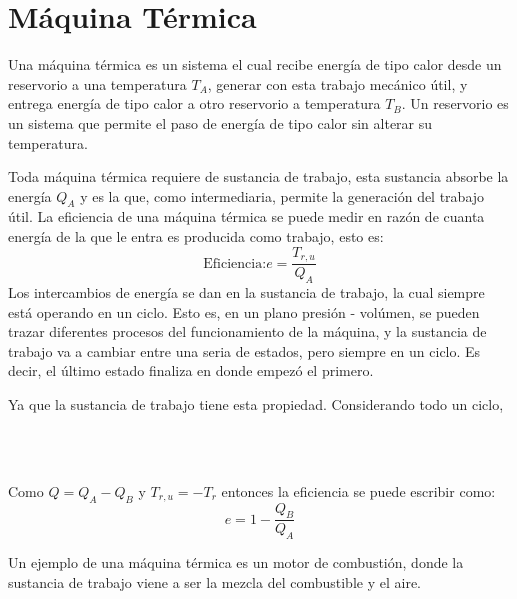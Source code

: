 \section{Máquina Térmica}

Una máquina térmica es un sistema el cual recibe energía de tipo
calor desde un reservorio a una temperatura $T_A$, generar con esta
trabajo mecánico útil, y entrega energía de tipo calor a otro reservorio
a temperatura $T_B$. Un reservorio es un sistema que permite el paso de
energía de tipo calor sin alterar su temperatura.

\begin{center}
\end{center}

Toda máquina térmica requiere de sustancia de trabajo, esta sustancia absorbe la energía
$Q_A$ y es la que, como intermediaria, permite la generación del trabajo útil. La
eficiencia de una máquina térmica se puede medir en razón de cuanta energía de la que le
entra es producida como trabajo, esto es:
\[\text{Eficiencia:} e = \frac{T_{r,u}}{Q_A}\]
Los intercambios de energía se dan en la sustancia de trabajo, la cual siempre está operando
en un ciclo. Esto es, en un plano presión - volúmen, se pueden trazar diferentes procesos
del funcionamiento de la máquina, y la sustancia de trabajo va a cambiar entre una seria de
estados, pero siempre en un ciclo. Es decir, el último estado finaliza en donde empezó el primero.

Ya que la sustancia de trabajo tiene esta propiedad. Considerando todo un ciclo,

\begin{longderivation}
    \\
  \\
\end{longderivation}

Como $Q = Q_A - Q_B$ y $T_{r,u} = -T_r$ entonces la eficiencia se puede escribir
como:
\[e = 1 - \frac{Q_B}{Q_A}\]

Un ejemplo de una máquina térmica es un motor de combustión, donde la sustancia de trabajo
viene a ser la mezcla del combustible y el aire.